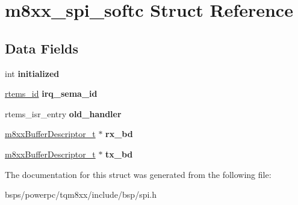 \hypertarget{structm8xx__spi__softc}{}\section{m8xx\+\_\+spi\+\_\+softc Struct Reference}
\label{structm8xx__spi__softc}
\subsection*{Data Fields}
\begin{DoxyCompactItemize}
\item 
\mbox{\label{structm8xx__spi__softc_a258fda1f0771c4e1d6d74ab5ab3cdad3}} 
int {\bfseries initialized}
\item 
\mbox{\label{structm8xx__spi__softc_a496cb9fe225bdf1f94b9ca2688dfbf1b}} 
\mbox{\hyperlink{group__ClassicTasks_gab20892b814dced7dd4e5b9bf42becd57}{rtems\+\_\+id}} {\bfseries irq\+\_\+sema\+\_\+id}
\item 
\mbox{\label{structm8xx__spi__softc_ae05db62bd456630a7dda8cc2e1fa16e8}} 
rtems\+\_\+isr\+\_\+entry {\bfseries old\+\_\+handler}
\item 
\mbox{\label{structm8xx__spi__softc_aa1e4ba3b657f4b9fe958eb55023e5c23}} 
\mbox{\hyperlink{structm8xxBufferDescriptor__}{m8xx\+Buffer\+Descriptor\+\_\+t}} $\ast$ {\bfseries rx\+\_\+bd}
\item 
\mbox{\label{structm8xx__spi__softc_ac97a528b4a3ee6a1ae2c31699fbd7650}} 
\mbox{\hyperlink{structm8xxBufferDescriptor__}{m8xx\+Buffer\+Descriptor\+\_\+t}} $\ast$ {\bfseries tx\+\_\+bd}
\end{DoxyCompactItemize}


The documentation for this struct was generated from the following file\+:\begin{DoxyCompactItemize}
\item 
bsps/powerpc/tqm8xx/include/bsp/spi.\+h\end{DoxyCompactItemize}

